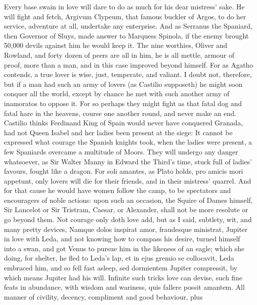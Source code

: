 {Every base swain in love will dare to do as much for his dear mistress'
sake. He will fight and fetch, Argivum Clypeum, that famous
buckler of Argos, to do her service, adventure at all, undertake any
enterprise. And as Serranus the Spaniard, then Governor of Sluys, made
answer to Marquess Spinola, if the enemy brought 50,000 devils against
him he would keep it. The nine worthies, Oliver and Rowland, and forty
dozen of peers are all in him, he is all mettle, armour of proof, more
than a man, and in this case improved beyond himself. For as
Agatho contends, a true lover is wise, just, temperate, and
valiant. I doubt not, therefore, but if a man had such an army of
lovers (as Castilio supposeth) he might soon conquer all the world,
except by chance he met with such another army of inamoratos to oppose
it. For so perhaps they might fight as that fatal dog and fatal
hare in the heavens, course one another round, and never make an end.
Castilio thinks Ferdinand King of Spain would never have conquered
Granada, had not Queen Isabel and her ladies been present at the siege:
It cannot be expressed what courage the Spanish knights took,
when the ladies were present, a few Spaniards overcame a multitude of
Moors. They will undergo any danger whatsoever, as Sir Walter Manny in
Edward the Third's time, stuck full of ladies' favours, fought like a
dragon. For soli amantes, as Plato holds, pro amicis mori
appetunt, only lovers will die for their friends, and in their
mistress' quarrel. And for that cause he would have women follow the
camp, to be spectators and encouragers of noble actions: upon such an
occasion, the Squire of Dames himself, Sir Lancelot or Sir
Tristram, Caesar, or Alexander, shall not be more resolute or go beyond
them.
Not courage only doth love add, but as I said, subtlety, wit, and many
pretty devices, Namque dolos inspirat amor, fraudesque ministrat,
Jupiter in love with Leda, and not knowing how to compass his
desire, turned himself into a swan, and got Venus to pursue him in the
likeness of an eagle; which she doing, for shelter, he fled to Leda's
lap, et in ejus gremio se collocavit, Leda embraced him, and so fell
fast asleep, sed dormientem Jupiter compressit, by which means Jupiter
had his will. Infinite such tricks love can devise, such fine feats in
abundance, with wisdom and wariness, quis fallere possit amantem.
All manner of civility, decency, compliment and good behaviour, plus
}
